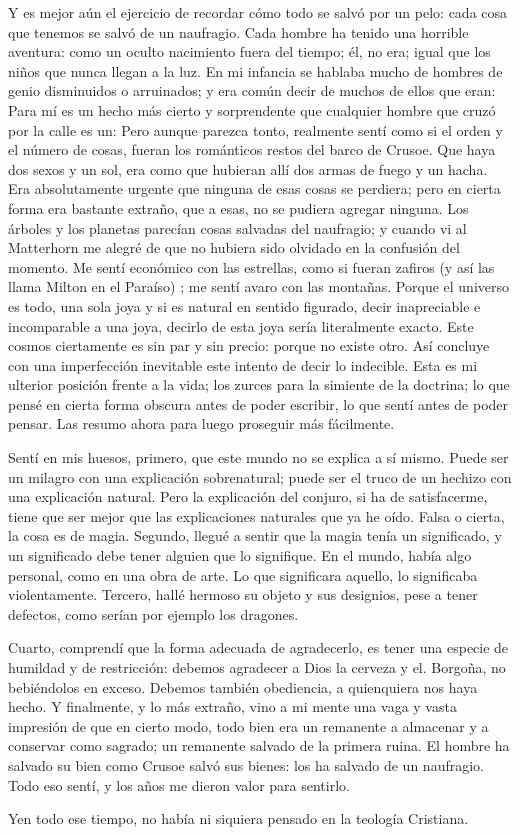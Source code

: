 Y es mejor aún el ejercicio de recordar cómo todo se salvó por un pelo: cada cosa que tenemos se
salvó de un naufragio. Cada hombre ha tenido una horrible aventura: como un oculto nacimiento fuera del
tiempo; él, no era; igual que los niños que nunca llegan a la luz. En mi infancia se hablaba mucho de
hombres de genio disminuidos o arruinados; y era común decir de muchos de ellos que eran:  Para mí es un hecho más cierto y sorprendente que cualquier hombre que cruzó por la
calle es un: 
Pero aunque parezca tonto, realmente sentí como si el orden y el número de cosas, fueran los
románticos restos del barco de Crusoe. Que haya dos sexos y un sol, era como que hubieran allí dos armas
de fuego y un hacha. Era absolutamente urgente que ninguna de esas cosas se perdiera; pero en cierta
forma era bastante extraño, que a esas, no se pudiera agregar ninguna. Los árboles y los planetas parecían
cosas salvadas del naufragio; y cuando vi al Matterhorn me alegré de que no hubiera sido olvidado en la
confusión del momento. Me sentí económico con las estrellas, como si fueran zafiros (y así las llama
Milton en el Paraíso) ; me sentí avaro con las montañas. Porque el universo es todo, una sola joya y si es
natural en sentido figurado, decir inapreciable e incomparable a una joya, decirlo de esta joya sería
literalmente exacto. Este cosmos ciertamente es sin par y sin precio: porque no existe otro. Así concluye
con una imperfección inevitable este intento de decir lo indecible. Esta es mi ulterior posición frente a la
vida; los zurces para la simiente de la doctrina; lo que pensé en cierta forma obscura antes de poder
escribir, lo que sentí antes de poder pensar. Las resumo ahora para luego proseguir más fácilmente.

Sentí en mis huesos, primero, que este mundo no se explica a sí mismo. Puede ser un milagro con
una explicación sobrenatural; puede ser el truco de un hechizo con una explicación natural. Pero la
explicación del conjuro, si ha de satisfacerme, tiene que ser mejor que las explicaciones naturales que ya
he oído. Falsa o cierta, la cosa es de magia. Segundo, llegué a sentir que la magia tenía un significado, y
un significado debe tener alguien que lo signifique. En el mundo, había algo personal, como en una obra
de arte. Lo que significara aquello, lo significaba violentamente. Tercero, hallé hermoso su objeto y sus
designios, pese a tener defectos, como serían por ejemplo los dragones.

Cuarto, comprendí que la forma adecuada de agradecerlo, es tener una especie de humildad y de
restricción: debemos agradecer a Dios la cerveza y el. Borgoña, no bebiéndolos en exceso. Debemos
también obediencia, a quienquiera nos haya hecho. Y finalmente, y lo más extraño, vino a mi mente una
vaga y vasta impresión de que en cierto modo, todo bien era un remanente a almacenar y a conservar
como sagrado; un remanente salvado de la primera ruina. El hombre ha salvado su bien como Crusoe
salvó sus bienes: los ha salvado de un naufragio. Todo eso sentí, y los años me dieron valor para sentirlo.

Yen todo ese tiempo, no había ni siquiera pensado en la teología Cristiana.
\finalCapituloOrnamento
